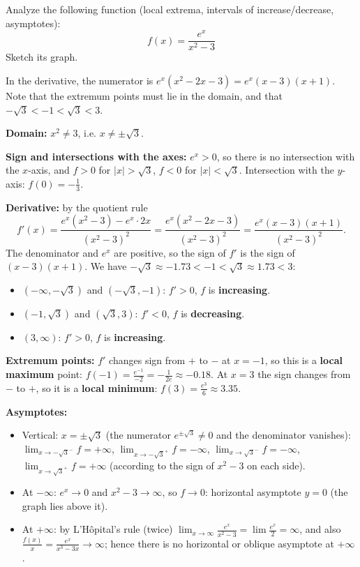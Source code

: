 
\begin{question}
Analyze the following function (local extrema, intervals of increase/decrease, asymptotes):
\[ f(x)=\frac{e^x}{x^2-3} \]
Sketch its graph.
\end{question}

\begin{hint}
In the derivative, the numerator is $e^x(x^2-2x-3)=e^x(x-3)(x+1)$. Note that the extremum points must lie in the domain, and that $-\sqrt3<-1<\sqrt3<3$.
\end{hint}

\begin{solution}
\textbf{Domain:} $x^2\neq3$, i.e. $x\neq\pm\sqrt3$.

\textbf{Sign and intersections with the axes:} $e^x>0$, so there is no intersection with the $x$-axis, and $f>0$ for $|x|>\sqrt3$, $f<0$ for $|x|<\sqrt3$. Intersection with the $y$-axis: $f(0)=-\frac13$.

\textbf{Derivative:} by the quotient rule
\[ f'(x)=\frac{e^x(x^2-3)-e^x\cdot2x}{(x^2-3)^2}=\frac{e^x(x^2-2x-3)}{(x^2-3)^2}=\frac{e^x(x-3)(x+1)}{(x^2-3)^2}. \]
The denominator and $e^x$ are positive, so the sign of $f'$ is the sign of $(x-3)(x+1)$. We have $-\sqrt3\approx-1.73<-1<\sqrt3\approx1.73<3$:
\begin{itemize}
  \item $(-\infty,-\sqrt3)$ and $(-\sqrt3,-1)$: $f'>0$, $f$ is \textbf{increasing}.
  \item $(-1,\sqrt3)$ and $(\sqrt3,3)$: $f'<0$, $f$ is \textbf{decreasing}.
  \item $(3,\infty)$: $f'>0$, $f$ is \textbf{increasing}.
\end{itemize}

\textbf{Extremum points:} $f'$ changes sign from $+$ to $-$ at $x=-1$, so this is a \textbf{local maximum} point: $f(-1)=\frac{e^{-1}}{-2}=-\frac1{2e}\approx-0.18$. At $x=3$ the sign changes from $-$ to $+$, so it is a \textbf{local minimum}: $f(3)=\frac{e^3}{6}\approx3.35$.

\textbf{Asymptotes:}
\begin{itemize}
  \item Vertical: $x=\pm\sqrt3$ (the numerator $e^{\pm\sqrt3}\neq0$ and the denominator vanishes):
  $\lim_{x\to-\sqrt3^-}f=+\infty$, $\lim_{x\to-\sqrt3^+}f=-\infty$, $\lim_{x\to\sqrt3^-}f=-\infty$, $\lim_{x\to\sqrt3^+}f=+\infty$ (according to the sign of $x^2-3$ on each side).
  \item At $-\infty$: $e^x\to0$ and $x^2-3\to\infty$, so $f\to0$: horizontal asymptote $y=0$ (the graph lies above it).
  \item At $+\infty$: by L'Hôpital's rule (twice) $\lim_{x\to\infty}\frac{e^x}{x^2-3}=\lim\frac{e^x}{2}=\infty$, and also $\frac{f(x)}{x}=\frac{e^x}{x^3-3x}\to\infty$; hence there is no horizontal or oblique asymptote at $+\infty$.
\end{itemize}


\end{solution}
